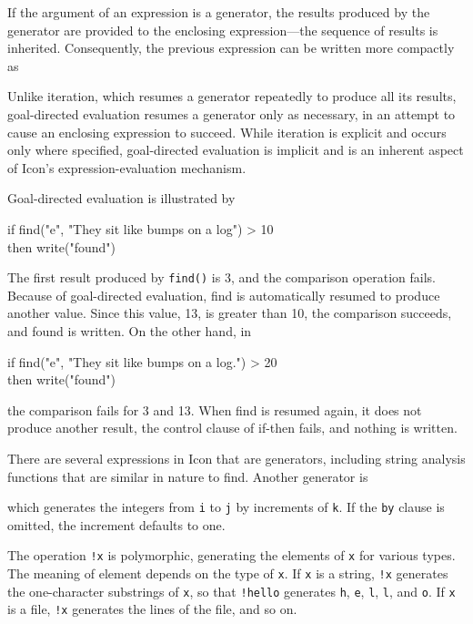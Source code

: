 If the argument of an expression is a generator, the results produced
by the generator are provided to the enclosing expression{}---the
sequence of results is inherited. Consequently, the previous
expression can be written more compactly as


Unlike iteration, which resumes a generator repeatedly to produce all
its results, goal-directed evaluation resumes a generator only as
necessary, in an attempt to cause an enclosing expression to
succeed. While iteration is explicit and occurs only where specified,
goal-directed evaluation is implicit and is an inherent aspect of
Icon's expression-evaluation mechanism.


Goal-directed evaluation is illustrated by

\begin{iconcode}
\>if find("e", "They sit like bumps on a log") > 10\\
\>then write("found")
\end{iconcode}

The first result produced by \texttt{find()} is 3, and the comparison
operation fails. Because of goal-directed evaluation, find is
automatically resumed to produce another value. Since this value, 13,
is greater than 10, the comparison succeeds, and found is written. On
the other hand, in

\begin{iconcode}
\>if find("e", "They sit like bumps on a log.") > 20\\
\>then write("found")
\end{iconcode}

\noindent the comparison fails for 3 and 13. When find is resumed
again, it does not produce another result, the control clause of
if-then fails, and nothing is written.

There are several expressions in Icon that are generators, including
string analysis functions that are similar in nature to find. Another
generator is


\noindent which generates the integers from \texttt{i} to \texttt{j} by
increments of \texttt{k}. If the \texttt{by} clause is omitted, the
increment defaults to one.

The operation \texttt{!x} is polymorphic, generating the elements of
\texttt{x} for various types. The meaning of
{\textquotedbl}element{\textquotedbl} depends on the type of
\texttt{x}. If \texttt{x} is a string, \texttt{!x} generates the
one-character substrings of \texttt{x}, so that
\texttt{!{\textquotedbl}hello{\textquotedbl}} generates
\texttt{{\textquotedbl}h{\textquotedbl}},
\texttt{{\textquotedbl}e{\textquotedbl}},
\texttt{{\textquotedbl}l{\textquotedbl}},
\texttt{{\textquotedbl}l{\textquotedbl}}, and
\texttt{{\textquotedbl}o{\textquotedbl}}. If \texttt{x} is a file,
\texttt{!x} generates the lines of the file, and so on.


